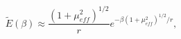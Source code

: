 \begin{equation}
\widetilde{E}\left(\beta \right)\approx \frac{\left(1+\mu _{eff}^{2}\right)^{1/2}}{r}e^{-\beta \left(1+\mu _{eff}^{2}\right)^{1/2}/r},\label{lowTenergy}\end{equation}


